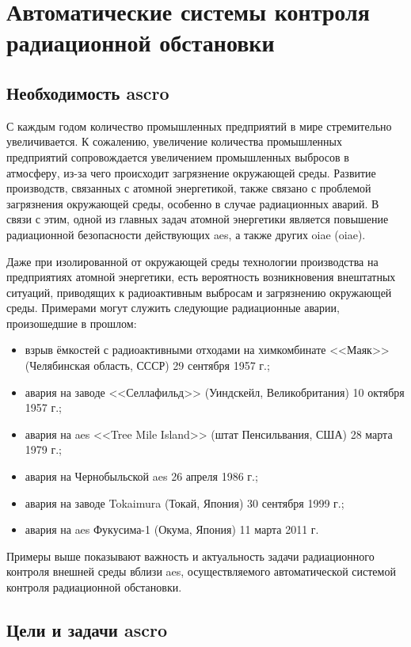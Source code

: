 \chapter{Автоматические системы контроля радиационной обстановки}

\section{Необходимость \ac{ascro}}

С каждым годом количество промышленных предприятий в мире стремительно увеличивается. К сожалению, увеличение количества 
промышленных предприятий сопровождается увеличением промышленных выбросов в атмосферу, из-за чего происходит загрязнение 
окружающей среды. Развитие производств, связанных с атомной энергетикой, также связано с проблемой загрязнения 
окружающей среды, особенно в случае радиационных аварий. В связи с этим, одной из главных задач атомной энергетики 
является повышение радиационной безопасности действующих \ac{aes}, а также других \ac{oiae} (\acl{oiae}).

Даже при изолированной от окружающей среды технологии производства на предприятиях атомной энергетики, есть вероятность 
возникновения внештатных ситуаций, приводящих к радиоактивным выбросам и загрязнению окружающей среды. Примерами могут 
служить следующие радиационные аварии, произошедшие в прошлом:

\begin{itemize}
	\item взрыв ёмкостей с радиоактивными отходами на химкомбинате <<Маяк>> (Челябинская область, СССР) 29 сентября 
		1957 г.;
	\item авария на заводе <<Селлафильд>> (Уиндскейл, Великобритания) 10 октября 1957 г.;
	\item авария на \ac{aes} <<Tree Mile Island>> (штат Пенсильвания, США) 28 марта 1979 г.;
	\item авария на Чернобыльской \ac{aes} 26 апреля 1986 г.;
	\item авария на заводе Tokaimura (Токай, Япония) 30 сентября 1999 г.;
	\item авария на \ac{aes} Фукусима-1 (Окума, Япония) 11 марта 2011 г.
\end{itemize}

Примеры выше показывают важность и актуальность задачи радиационного контроля внешней среды вблизи \ac{aes}, 
осуществляемого автоматической системой контроля радиационной обстановки. 

\section{Цели и задачи \ac{ascro}}

